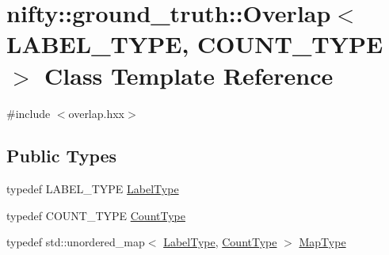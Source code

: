 \hypertarget{classnifty_1_1ground__truth_1_1Overlap}{}\section{nifty\+:\+:ground\+\_\+truth\+:\+:Overlap$<$ L\+A\+B\+E\+L\+\_\+\+T\+Y\+P\+E, C\+O\+U\+N\+T\+\_\+\+T\+Y\+P\+E $>$ Class Template Reference}
\label{classnifty_1_1ground__truth_1_1Overlap}


{\ttfamily \#include $<$overlap.\+hxx$>$}

\subsection*{Public Types}
\begin{DoxyCompactItemize}
\item 
typedef L\+A\+B\+E\+L\+\_\+\+T\+Y\+P\+E \hyperlink{classnifty_1_1ground__truth_1_1Overlap_af14b9a872d3736d3115231866bc71612}{Label\+Type}
\item 
typedef C\+O\+U\+N\+T\+\_\+\+T\+Y\+P\+E \hyperlink{classnifty_1_1ground__truth_1_1Overlap_ab8f82b8fef890dc3d7b69da0cc768c76}{Count\+Type}
\item 
typedef std\+::unordered\+\_\+map$<$ \hyperlink{classnifty_1_1ground__truth_1_1Overlap_af14b9a872d3736d3115231866bc71612}{Label\+Type}, \hyperlink{classnifty_1_1ground__truth_1_1Overlap_ab8f82b8fef890dc3d7b69da0cc768c76}{Count\+Type} $>$ \hyperlink{classnifty_1_1ground__truth_1_1Overlap_a6866ee8c988dd21d3fbd6ee5c2e836bf}{Map\+Type}
\end{DoxyCompactItemize}
